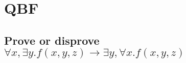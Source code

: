 \documentclass[letter,12pt]{article}
\begin{document}
\section{QBF}
\label{sec:qbf}


\subsection{Prove or disprove $\forall x, \exists y.f(x, y, z) \rightarrow \exists y, \forall x.f(x, y, z)$}
\label{ssec:q2a}





\end{document}
